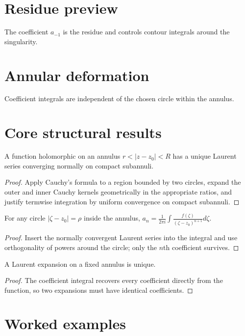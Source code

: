 \section{Residue preview}
The coefficient $a_{-1}$ is the residue and controls contour integrals around the singularity.

\section{Annular deformation}
Coefficient integrals are independent of the chosen circle within the annulus.

\section{Core structural results}

\begin{theorem}\label{thm:iv08-01}
A function holomorphic on an annulus $r<|z-z_0|<R$ has a unique Laurent series converging normally on compact subannuli.
\begin{proof}
Apply Cauchy's formula to a region bounded by two circles, expand the outer and inner Cauchy kernels geometrically in the appropriate ratios, and justify termwise integration by uniform convergence on compact subannuli.
\end{proof}
\end{theorem}

\begin{theorem}\label{thm:iv08-02}
For any circle $|\zeta-z_0|=\rho$ inside the annulus, $a_n=\frac1{2\pi i}\int\frac{f(\zeta)}{(\zeta-z_0)^{n+1}}d\zeta$.
\begin{proof}
Insert the normally convergent Laurent series into the integral and use orthogonality of powers around the circle; only the $n$th coefficient survives.
\end{proof}
\end{theorem}

\begin{theorem}[Uniqueness]\label{thm:iv08-03}
A Laurent expansion on a fixed annulus is unique.
\begin{proof}
The coefficient integral recovers every coefficient directly from the function, so two expansions must have identical coefficients.
\end{proof}
\end{theorem}

\section{Worked examples}

